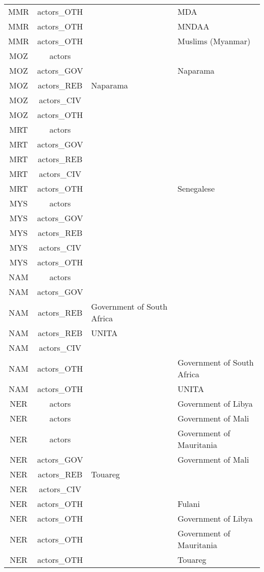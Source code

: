 \documentclass[12pt]{article}
\begin{document}
\begin{center}
\begin{longtable}{|c|c|p{7cm}|p{7cm}|}
  MMR & actors\_OTH &  & MDA \\ 
  MMR & actors\_OTH &  & MNDAA \\ 
  MMR & actors\_OTH &  & Muslims (Myanmar) \\ 
  MOZ & actors &  &  \\ 
  MOZ & actors\_GOV &  & Naparama \\ 
  MOZ & actors\_REB & Naparama &  \\ 
  MOZ & actors\_CIV &  &  \\ 
  MOZ & actors\_OTH &  &  \\ 
  MRT & actors &  &  \\ 
  MRT & actors\_GOV &  &  \\ 
  MRT & actors\_REB &  &  \\ 
  MRT & actors\_CIV &  &  \\ 
  MRT & actors\_OTH &  & Senegalese \\ 
  MYS & actors &  &  \\ 
  MYS & actors\_GOV &  &  \\ 
  MYS & actors\_REB &  &  \\ 
  MYS & actors\_CIV &  &  \\ 
  MYS & actors\_OTH &  &  \\ 
  NAM & actors &  &  \\ 
  NAM & actors\_GOV &  &  \\ 
  NAM & actors\_REB & Government of South Africa &  \\ 
  NAM & actors\_REB & UNITA &  \\ 
  NAM & actors\_CIV &  &  \\ 
  NAM & actors\_OTH &  & Government of South Africa \\ 
  NAM & actors\_OTH &  & UNITA \\ 
  NER & actors &  & Government of Libya \\ 
  NER & actors &  & Government of Mali \\ 
  NER & actors &  & Government of Mauritania \\ 
  NER & actors\_GOV &  & Government of Mali \\ 
  NER & actors\_REB & Touareg &  \\ 
  NER & actors\_CIV &  &  \\ 
  NER & actors\_OTH &  & Fulani \\ 
  NER & actors\_OTH &  & Government of Libya \\ 
  NER & actors\_OTH &  & Government of Mauritania \\ 
  NER & actors\_OTH &  & Touareg \\ 

\end{longtable}
\end{center}
\end{document}
